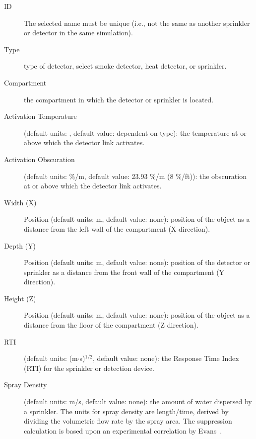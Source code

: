\begin{description}
\item[ID]  The selected name must be unique (i.e., not the same as another sprinkler or detector in the same simulation).

\item[Type] type of detector, select smoke detector, heat detector, or sprinkler.

\item[Compartment] the compartment in which the detector or sprinkler is located.

\item[Activation Temperature] (default units: \degc, default value: dependent on type): the temperature at or above which the detector link activates.

\item[Activation Obscuration] (default units: \%/m, default value: 23.93 \%/m (8 \%/ft)): the obscuration at or above which the detector link activates.

\item[Width (X)] Position (default units: m, default value: none): position of the object as a distance from the left wall of the compartment (X direction).

\item[Depth (Y)] Position (default units: m, default value: none): position of the detector or sprinkler as a distance from the front wall of the compartment (Y direction).

\item[Height (Z)] Position (default units: m, default value: none): position of the object as a distance from the floor of the compartment (Z direction).

\item[RTI] (default units: (m$\cdot$s)$^{1/2}$, default value: none): the Response Time Index (RTI) for the sprinkler or detection device.

\item[Spray Density] (default units: m/s, default value: none): the amount of water dispersed by a sprinkler.  The units for spray density are length/time, derived by dividing the volumetric flow rate by the spray area. The suppression calculation is based upon an experimental correlation by Evans~\cite{Evans:1993}.
\end{description}


